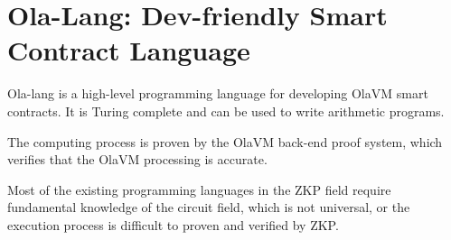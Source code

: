 \section{Ola-Lang: Dev-friendly Smart Contract Language}\label{sec:ola-lang}

Ola-lang is a high-level programming language for developing OlaVM smart contracts.
It is Turing complete and can be used to write arithmetic programs.

The computing process is proven by the OlaVM back-end proof system, which verifies that the OlaVM processing is accurate.

Most of the existing programming languages in the ZKP field require fundamental knowledge of the circuit field,
which is not universal, or the execution process is difficult to proven and verified by ZKP.




